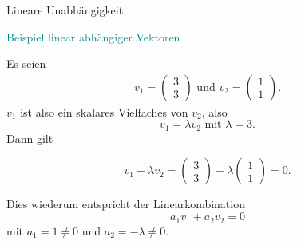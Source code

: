 \documentclass[
  8pt,
  ignorenonframetext,
]{beamer}
\begin{document}
\begin{frame}{Lineare Unabhängigkeit}
\protect\hypertarget{lineare-unabhuxe4ngigkeit-3}{}
\vspace{3mm}
\small

\textcolor{darkcyan}{Beispiel linear abhängiger Vektoren}

\footnotesize

Es seien \begin{align*}
v_1 = \begin{pmatrix} 3 \\ 3 \end{pmatrix} \text{ und }
v_2 = \begin{pmatrix} 1 \\ 1 \end{pmatrix}.
\end{align*} \(v_1\) ist also ein skalares Vielfaches von \(v_2\), also
\begin{equation}
v_1 = \lambda v_2 \mbox{ mit } \lambda =3.
\end{equation} Dann gilt

\begin{equation}
v_1 - \lambda v_2 = \begin{pmatrix} 3 \\ 3 \end{pmatrix} -
\lambda \begin{pmatrix} 1 \\ 1 \end{pmatrix} = 0.
\end{equation}

Dies wiederum entspricht der Linearkombination \begin{equation}
a_1v_1 + a_2v_2 = 0
\end{equation} mit \(a_1 = 1 \neq 0\) und \(a_2 = -\lambda \neq 0\).
\end{frame}
\end{document}
